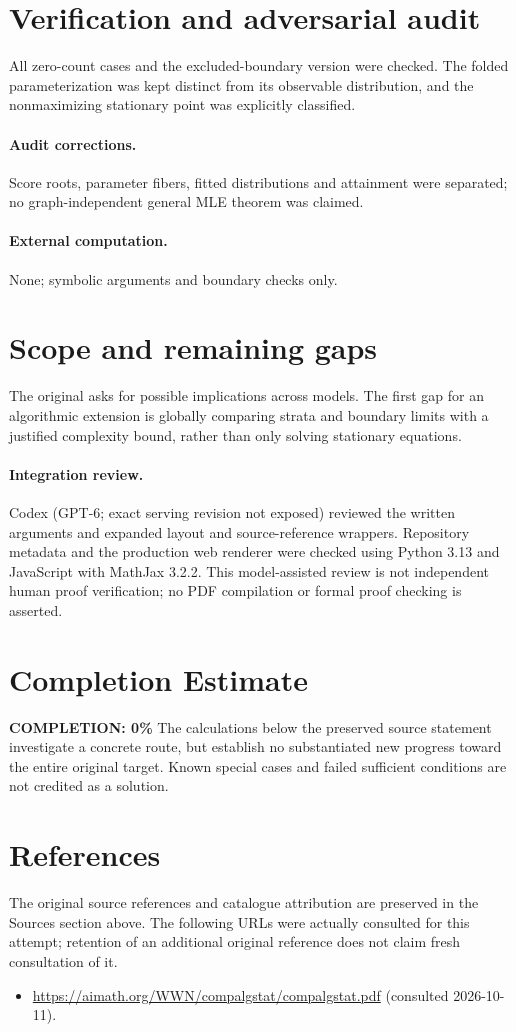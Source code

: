 \documentclass[11pt]{article}
\begin{document}
\section{Verification and adversarial audit}
All zero-count cases and the excluded-boundary version were checked.
The folded parameterization was kept distinct from its observable distribution,
and the nonmaximizing stationary point was explicitly classified.
\paragraph{Audit corrections.} Score roots, parameter fibers, fitted distributions and attainment were separated; no graph-independent general MLE theorem was claimed.
\paragraph{External computation.} None; symbolic arguments and boundary checks only.
\section{Scope and remaining gaps}
The original asks for possible implications across models. The first gap
for an algorithmic extension is globally comparing strata and boundary limits
with a justified complexity bound, rather than only solving stationary equations.
\paragraph{Integration review.} Codex (GPT-6; exact serving revision not exposed) reviewed the written arguments and expanded layout and source-reference wrappers. Repository metadata and the production web renderer were checked using Python 3.13 and JavaScript with MathJax 3.2.2. This model-assisted review is not independent human proof verification; no PDF compilation or formal proof checking is asserted.

\section{Completion Estimate}
\noindent\textbf{COMPLETION: 0\%}
The calculations below the preserved source statement investigate a concrete route,
but establish no substantiated new progress toward the entire original target.
Known special cases and failed sufficient conditions are not credited as a solution.
\section{References}
The original source references and catalogue attribution are preserved in the
Sources section above. The following URLs were actually consulted for this attempt;
retention of an additional original reference does not claim fresh consultation of it.
\begin{itemize}
\item \url{https://aimath.org/WWN/compalgstat/compalgstat.pdf} (consulted 2026-10-11). 
\end{itemize}
\end{document}
